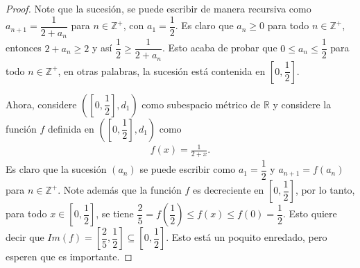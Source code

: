 \begin{itemize}[leftmargin=*]
\begin{enumerate}[a)]
\begin{proof}
            Note que la sucesión, se puede escribir de manera recursiva como $a_{n+1}=\dfrac{1}{2+a_{n}}$ para $n \in \mathbb{Z}^+$, con $a_1=\dfrac{1}{2}$. Es claro que $a_n \geq 0$ para todo $n \in \mathbb{Z}^+$, entonces $2+a_n\geq 2$ y así $\dfrac{1}{2}\geq\dfrac{1}{2+a_n}$. Esto acaba de probar que $0\leq a_n \leq \dfrac{1}{2}$ para todo $n \in \mathbb{Z}^+$, en otras palabras, la sucesión está contenida en $\left[0,\dfrac{1}{2}\right]$. 

            Ahora, considere $\left(\left[0,\dfrac{1}{2}\right],d_1\right)$ como subespacio métrico de $\mathbb{R}$ y considere la función $f$ definida en  $\left(\left[0,\dfrac{1}{2}\right],d_1\right)$ como
            \begin{align*}
                f(x)=\frac{1}{2+x}.
            \end{align*}
            Es claro que la sucesión $(a_n)$ se puede escribir como $a_1=\dfrac{1}{2}$ y $a_{n+1}=f(a_n)$ para $n \in \mathbb{Z}^+$. Note además que la función $f$ es decreciente en $\left[0,\dfrac{1}{2}\right]$, por lo tanto, para todo $x \in \left[0,\dfrac{1}{2}\right]$, se tiene $\dfrac{2}{5}=f\left(\dfrac{1}{2}\right)\leq f(x) \leq f(0)=\dfrac{1}{2}$. Esto quiere decir que $Im (f)=\left[\dfrac{2}{5},\dfrac{1}{2}\right] \subseteq \left[0,\dfrac{1}{2}\right]$. Esto está un poquito enredado, pero esperen que es importante. 


\end{proof}
\end{enumerate}
\end{itemize}
